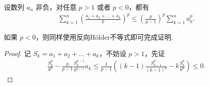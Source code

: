 \documentclass[../../main.tex]{subfiles}
\begin{document}
\begin{corollary}[离散版Hardy不等式]\label{corollary:离散版Hardy(哈代)不等式}
设数列 $a_n$ 非负，对任意 $p > 1$ 或者 $p < 0$，都有
\begin{align*}
\sum_{k=1}^n \left( \frac{a_1 + a_2 + \dots + a_k}{k} \right)^p \leqslant \left( \frac{p}{p - 1} \right)^p \sum_{k=1}^n a_k^p.
\end{align*}
\end{corollary}
\begin{remark}
如果 $p < 0$，则同样使用反向Hölder不等式即可完成证明.
\end{remark}
\begin{proof}
记 $S_k = a_1 + a_2 + \dots + a_k$，不妨设 $p > 1$，先证
\begin{align}\label{eq::dfj0238r834f34r}
\frac{S_k^p}{k^p} - \frac{p}{p - 1} \frac{S_k^{p - 1}}{k^{p - 1}} a_k \leqslant \frac{1}{p - 1} \left( (k - 1) \frac{S_{k - 1}^p}{(k - 1)^p} - k \frac{S_k^p}{k^p} \right)\leqslant 0.
\end{align}


\end{proof}
\end{document}
